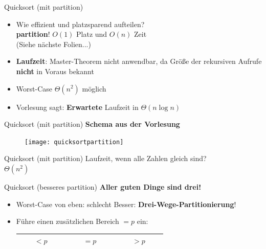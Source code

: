 \begin{frame}{Quicksort (mit partition)}
	\begin{itemize}
		\item Wie effizient und platzsparend aufteilen? \\
		\impl \textbf{partition}! $O(1)$ Platz und $O(n)$ Zeit  \\
		(Siehe nächste Folien...)
		\pause
		\item \textbf{Laufzeit}: Master-Theorem nicht anwendbar, da Größe der rekursiven Aufrufe \textbf{nicht} in Voraus bekannt
		\pause
		\item Worst-Case $\Theta(n^2)$ möglich
		\pause
		\item Vorlesung sagt: \textbf{Erwartete} Laufzeit in $\Theta(n \log n)$
	\end{itemize}
\end{frame}



\begin{frame}{Quicksort (mit partition)}
	\textbf{Schema aus der Vorlesung}
	\begin{figure}[htp]
		\centering
		\texttt{[image: quicksortpartition]}
	\end{figure}
\end{frame}

\begin{frame}[t]{Quicksort (mit partition)}
	Laufzeit, wenn alle Zahlen gleich sind? \\
	\pause
	\impl $\Theta(n^2)$ \\
	\pause
\end{frame}

\begin{frame}{Quicksort (besseres partition)}
	\textbf{Aller guten Dinge sind drei!} \\
	\begin{itemize}
		\item Worst-Case von eben: schlecht \frownie
		\pause
		\implitem Besser: \textbf{Drei-Wege-Partitionierung}!
		\item Führe einen zusätzlichen Bereich $ = p$ ein: \\
		\begin{tabular}{|c|c|c|}
			\hline
			$\qquad < p \qquad$ & \cellcolor{cyan!50} $\qquad = p \qquad$ & $\qquad > p \qquad$ \\
			\hline
		\end{tabular} 
	\end{itemize}
\end{frame}

